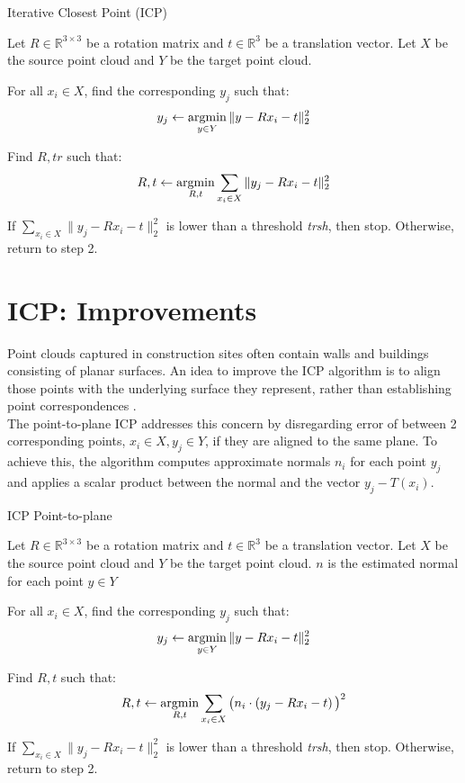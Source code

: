 \begin{algorithm}[h]
\caption{Iterative Closest Point (ICP)}\label{alg:ICP}
\begin{description}[leftmargin=!, labelwidth=\widthof{\textbf{Step1: }}]
    \item [Step 1] Let $R \in \mathbb{R}^{3\times 3}$ be a rotation matrix and $t \in \mathbb{R}^3$ be a translation vector. Let $X$ be the source point cloud and $Y$ be the target point cloud.
    \item [Step 2] For all $x_i \in X$, find the corresponding $y_j$ such that:
        \[
            y_j \gets \operatorname*{argmin}_{y \in Y} \| y - R x_i - t\|_2^2
        \]
    \item [Step 3] Find $R,tr$ such that:
        \[
            R,t \gets \operatorname*{argmin}_{R,t} \sum_{x_i \in X} \|y_j - R x_i - t\|_2^2
        \]
    \item [Step 4] If $\sum_{x_i \in X} \| y_j - R x_i - t\|_2^2$ is lower than a threshold \textit{trsh}, then stop. Otherwise, return to step 2. 
\end{description}
\end{algorithm}
\section{ICP: Improvements \label{sec:ICP_improvements}}
Point clouds captured in construction sites often contain walls and buildings consisting of planar surfaces. An idea to improve the ICP algorithm is to align those points with the underlying surface they represent, rather than establishing point correspondences \cite{CyrillYoutube} \cite{ICP-point-to-plane}.\\
The point-to-plane ICP addresses this concern by disregarding error of between 2 corresponding points, $x_i \in X, y_j \in Y$, if they are aligned to the same plane. To achieve this, the algorithm computes approximate normals $n_i$ for each point $y_j$ and applies a scalar product between the normal and the vector $y_j - T(x_i)$.

\begin{algorithm}[H]
\caption{ICP Point-to-plane}\label{alg:ICP_Point_to_Plane}
\begin{description}[leftmargin=!, labelwidth=\widthof{\textbf{Step1: }}]
    \item [Step 1] Let $R \in \mathbb{R}^{3\times 3}$ be a rotation matrix and $t \in \mathbb{R}^3$ be a translation vector. Let $X$ be the source point cloud and $Y$ be the target point cloud. $n$ is the estimated normal for each point $y \in Y$
    \item [Step 2] For all $x_i \in X$, find the corresponding $y_j$ such that:
        \[
            y_j \gets \operatorname*{argmin}_{y \in Y} \| y - R x_i - t\|_2^2
        \]
    \item [Step 3] Find $R,t$ such that:
        \[
            R,t \gets \operatorname*{argmin}_{R,t} \sum_{x_i \in X} \big(n_i \cdot \left(y_j - R x_i - t\right)\big)^2
        \]
    \item [Step 4] If $\sum_{x_i \in X} \| y_j - R x_i - t\|_2^2$ is lower than a threshold \textit{trsh}, then stop. Otherwise, return to step 2. 
\end{description}
\end{algorithm}
